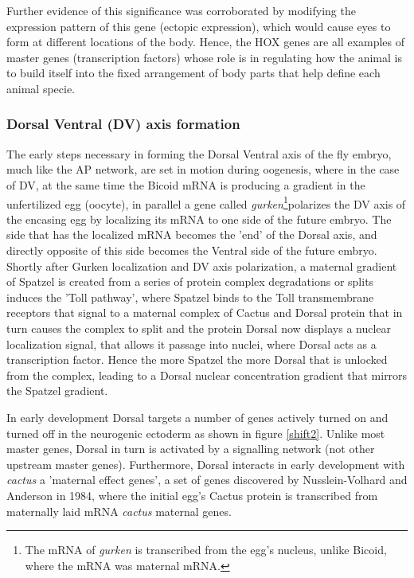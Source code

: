 Further evidence of this significance was corroborated by modifying the expression pattern of this gene (ectopic expression), which would cause eyes to form at different locations of the body\cite{pmid10461206}.  Hence, the HOX genes are all examples of master genes (transcription factors) whose role is in regulating how the animal is to build itself into the fixed arrangement of body parts that help define each animal specie. 

\subsubsection{Dorsal Ventral (DV) axis formation}
The early steps necessary in forming the Dorsal Ventral axis of the fly embryo, much like the AP network, are set in motion during oogenesis, where in the case of DV, at the same time the Bicoid mRNA is producing a gradient in the unfertilized egg (oocyte), in parallel a gene called \textit{gurken}\footnote{The mRNA of \textit{gurken} is transcribed from the egg's nucleus, unlike Bicoid, where the mRNA was maternal mRNA.}polarizes the DV axis of the encasing egg by localizing its mRNA to one side of the future embryo.  The side that has the localized mRNA becomes the 'end' of the Dorsal axis, and directly opposite of this side becomes the Ventral side of the future embryo.  Shortly after Gurken localization and DV axis polarization, a maternal gradient of Spatzel is created from a series of protein complex degradations or splits induces the 'Toll pathway', where Spatzel binds to the Toll transmembrane receptors that signal to a maternal complex of Cactus and Dorsal protein that in turn causes the complex to split and the protein Dorsal now displays a nuclear localization signal, that allows it passage into nuclei, where Dorsal acts as a transcription factor.  Hence the more Spatzel the more Dorsal that is unlocked from the complex, leading to a Dorsal nuclear concentration gradient that mirrors the Spatzel gradient.

 In early development Dorsal targets a number of genes actively turned on and turned off in the neurogenic ectoderm as shown in figure \ref{shift2}.  Unlike most master genes, Dorsal in turn is activated by a signalling network (not other upstream master genes).  Furthermore, Dorsal interacts in early development with \textit{cactus} a 'maternal effect genes', a set of genes discovered by Nusslein-Volhard and Anderson in 1984, where the initial egg's Cactus protein is transcribed from maternally laid mRNA \textit{cactus} maternal genes.
  
